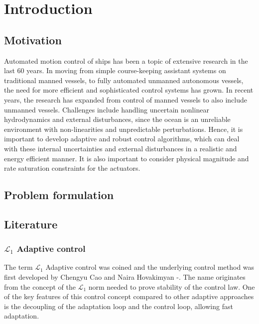 
\chapter{Introduction}

\section{Motivation}
Automated motion control of ships has been a topic of extensive research in the last 60 years. In moving from simple course-keeping assistant systems on traditional manned vessels, to fully automated unmanned autonomous vessels, the need for more efficient and sophisticated control systems has grown. In recent years, the research has expanded from control of manned vessels to also include unmanned vessels. Challenges include handling uncertain nonlinear hydrodynamics and external disturbances, since the ocean is an unreliable environment with non-linearities and unpredictable perturbations. Hence, it is important to develop adaptive and robust control algorithms, which can deal with these internal uncertainties and external disturbances in a realistic and energy efficient manner. It is also important to
consider physical magnitude and rate saturation constraints for the actuators.


\section{Problem formulation}



\section{Literature}
\subsection{$\mathcal{L}_1$ Adaptive control}
The term $\mathcal{L}_1$ Adaptive control was coined and the underlying control method was first developed by Chengyu Cao and Naira Hovakimyan \citep{Cao20061}-\citep{Cao20062}. The name originates from the concept of the $\mathcal{L}_1$ norm needed to prove stability of the control law. One of the key features of this control concept compared to other adaptive approaches is the decoupling of the adaptation loop and the control loop, allowing fast adaptation. 

